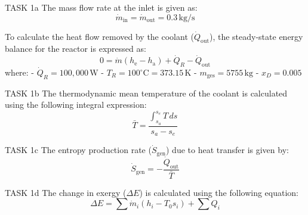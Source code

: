 TASK 1a  
The mass flow rate at the inlet is given as:  
\[
\dot{m}_{\text{in}} = \dot{m}_{\text{out}} = 0.3 \, \text{kg/s}
\]

To calculate the heat flow removed by the coolant (\( \dot{Q}_{\text{out}} \)), the steady-state energy balance for the reactor is expressed as:  
\[
0 = \dot{m} \left( h_{\text{e}} - h_{\text{a}} \right) + \dot{Q}_R - \dot{Q}_{\text{out}}
\]
where:  
- \( \dot{Q}_R = 100,000 \, \text{W} \)  
- \( T_R = 100^\circ\text{C} = 373.15 \, \text{K} \)  
- \( m_{\text{ges}} = 5755 \, \text{kg} \)  
- \( x_D = 0.005 \)  

TASK 1b  
The thermodynamic mean temperature of the coolant is calculated using the following integral expression:  
\[
\bar{T} = \frac{\int_{s_a}^{s_e} T \, ds}{s_a - s_e}
\]

TASK 1c  
The entropy production rate (\( \dot{S}_{\text{gen}} \)) due to heat transfer is given by:  
\[
\dot{S}_{\text{gen}} = -\frac{\dot{Q}_{\text{out}}}{\bar{T}}
\]

TASK 1d  
The change in exergy (\( \Delta E \)) is calculated using the following equation:  
\[
\Delta E = \sum \dot{m}_i \left( h_i - T_0 s_i \right) + \sum Q_i
\]
